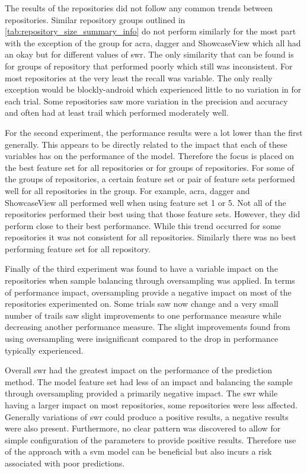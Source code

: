 The results of the repositories did not follow any common trends between repositories. Similar repository groups outlined in \autoref{tab:repository_size_summary_info} do not perform similarly for the most part with the exception of the group for acra, dagger and ShowcaseView which all had an okay but for different values of \gls{swr}. The only similarity that can be found is for groups of repository that performed poorly which still was inconsistent. For most repositories at the very least the recall was variable. The only really exception would be blockly-android which experienced little to no variation in for each trial. Some repositories saw more variation in the precision and accuracy and often had at least trail which performed moderately well.

For the second experiment, the performance results were a lot lower than the first generally. This appears to be directly related to the impact that each of these variables has on the performance of the model. Therefore the focus is placed on the best feature set for all repositories or for groups of repositories. For some of the groups of repositories, a certain feature set or pair of feature sets performed well for all repositories in the group. For example, acra, dagger and ShowcaseView all performed well when using feature set 1 or 5. Not all of the repositories performed their best using that those feature sets. However, they did perform close to their best performance. While this trend occurred for some repositories it was not consistent for all repositories. Similarly there was no best performing feature set for all repository.

Finally of the third experiment was found to have a variable impact on the repositories when sample balancing through oversampling was applied. In terms of performance impact, oversampling provide a negative impact on most of the repositories experimented on. Some trials saw now change and a very small number of trails saw slight improvements to one performance measure while decreasing another performance measure. The slight improvements found from using oversampling were insignificant compared to the drop in performance typically experienced.

Overall \gls{swr} had the greatest impact on the performance of the prediction method. The model feature set had less of an impact and balancing the sample through oversampling provided a primarily negative impact. The \gls{swr} while having a larger impact on most repositories, some repositories were less affected. Generally variations of \gls{swr} could produce a positive results, a negative results were also present. Furthermore, no clear pattern was discovered to allow for simple configuration of the parameters to provide positive results. Therefore use of the approach with a \gls{svm} model can be beneficial but also incurs a risk associated with poor predictions.

